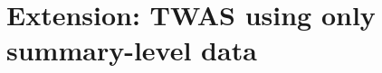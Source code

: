 \documentclass[../main.tex]{subfiles}
\begin{document}
\chapter{Extension: TWAS using only summary-level data}
\end{document}
